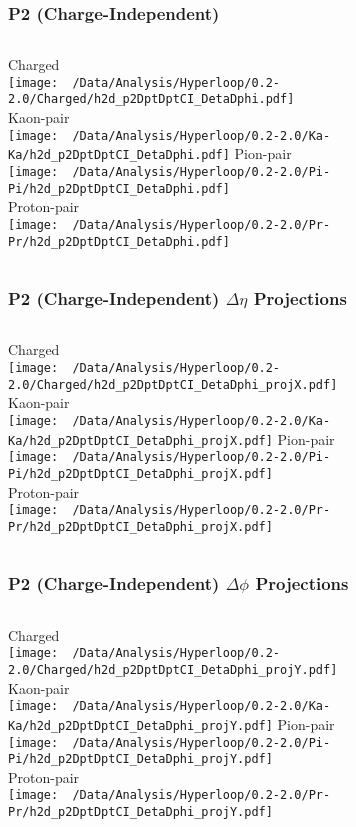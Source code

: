 \documentclass{beamer}
\begin{document}
\begin{frame}
	\frametitle{P2 (Charge-Independent)}
	\begin{columns}
		\centering
		Charged\\
		\texttt{[image: ~/Data/Analysis/Hyperloop/0.2-2.0/Charged/h2d\_p2DptDptCI\_DetaDphi.pdf]}\\Kaon-pair\\
		\texttt{[image: ~/Data/Analysis/Hyperloop/0.2-2.0/Ka-Ka/h2d\_p2DptDptCI\_DetaDphi.pdf]}
		\centering
		Pion-pair\\
		\texttt{[image: ~/Data/Analysis/Hyperloop/0.2-2.0/Pi-Pi/h2d\_p2DptDptCI\_DetaDphi.pdf]}\\Proton-pair\\
		\texttt{[image: ~/Data/Analysis/Hyperloop/0.2-2.0/Pr-Pr/h2d\_p2DptDptCI\_DetaDphi.pdf]}
	\end{columns}
\end{frame}
\begin{frame}
	\frametitle{P2 (Charge-Independent) $\Delta\eta$ Projections}
	\begin{columns}
		\column{0.5\textwidth}
		\centering
		Charged\\
		\texttt{[image: ~/Data/Analysis/Hyperloop/0.2-2.0/Charged/h2d\_p2DptDptCI\_DetaDphi\_projX.pdf]}\\Kaon-pair\\
		\texttt{[image: ~/Data/Analysis/Hyperloop/0.2-2.0/Ka-Ka/h2d\_p2DptDptCI\_DetaDphi\_projX.pdf]}
		\column{0.5\textwidth}
		\centering
		Pion-pair\\
		\texttt{[image: ~/Data/Analysis/Hyperloop/0.2-2.0/Pi-Pi/h2d\_p2DptDptCI\_DetaDphi\_projX.pdf]}\\Proton-pair\\
		\texttt{[image: ~/Data/Analysis/Hyperloop/0.2-2.0/Pr-Pr/h2d\_p2DptDptCI\_DetaDphi\_projX.pdf]}
	\end{columns}
\end{frame}
\begin{frame}
	\frametitle{P2 (Charge-Independent) $\Delta\phi$ Projections}
	\begin{columns}
		\centering
		Charged\\
		\texttt{[image: ~/Data/Analysis/Hyperloop/0.2-2.0/Charged/h2d\_p2DptDptCI\_DetaDphi\_projY.pdf]}\\Kaon-pair\\
		\texttt{[image: ~/Data/Analysis/Hyperloop/0.2-2.0/Ka-Ka/h2d\_p2DptDptCI\_DetaDphi\_projY.pdf]}
		\centering
		Pion-pair\\
		\texttt{[image: ~/Data/Analysis/Hyperloop/0.2-2.0/Pi-Pi/h2d\_p2DptDptCI\_DetaDphi\_projY.pdf]}\\Proton-pair\\
		\texttt{[image: ~/Data/Analysis/Hyperloop/0.2-2.0/Pr-Pr/h2d\_p2DptDptCI\_DetaDphi\_projY.pdf]}
	\end{columns}
\end{frame}
\end{document}
